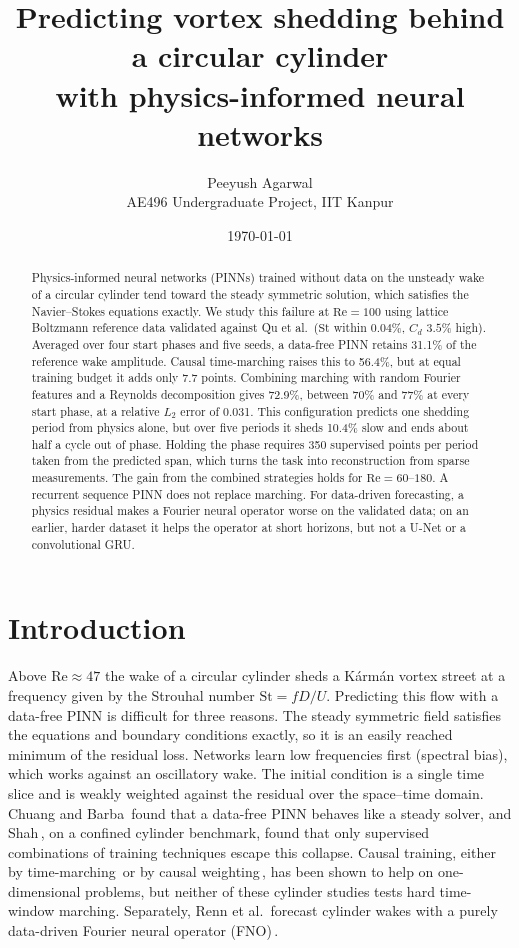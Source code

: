 \documentclass[11pt,a4paper]{article}
\title{\textbf{Predicting vortex shedding behind a circular cylinder\\
with physics-informed neural networks}}
\author{Peeyush Agarwal\\[2pt]
\small AE496 Undergraduate Project, IIT Kanpur}
\date{\today}
\newcommand{\Rey}{\mathrm{Re}}
\newcommand{\St}{\mathrm{St}}
\newcommand{\Cd}{C_d}
\begin{document}
\maketitle

\begin{abstract}
\noindent
Physics-informed neural networks (PINNs) trained without data on the unsteady
wake of a circular cylinder tend toward the steady symmetric solution, which
satisfies the Navier--Stokes equations exactly. We study this failure at
$\Rey = 100$ using lattice Boltzmann reference data validated against Qu et
al.\ ($\St$ within $0.04\%$, $\Cd$ $3.5\%$ high). Averaged over four start
phases and five seeds, a data-free PINN retains 31.1\% of the reference wake
amplitude. Causal time-marching raises this to 56.4\%, but at equal training
budget it adds only 7.7 points. Combining marching with random Fourier
features and a Reynolds decomposition gives 72.9\%, between 70\% and 77\% at
every start phase, at a relative $L_2$ error of 0.031. This configuration
predicts one shedding period from physics alone, but over five periods it
sheds 10.4\% slow and ends about half a cycle out of phase. Holding the phase
requires 350 supervised points per period taken from the predicted span, which
turns the task into reconstruction from sparse measurements. The gain from
the combined strategies holds for $\Rey = 60$--$180$. A recurrent sequence
PINN does not replace marching. For data-driven forecasting, a physics
residual makes a Fourier neural operator worse on the validated data; on an
earlier, harder dataset it helps the operator at short horizons, but not a
U-Net or a convolutional GRU.
\end{abstract}

\section{Introduction}

Above $\Rey \approx 47$ the wake of a circular cylinder sheds a K\'arm\'an
vortex street at a frequency given by the Strouhal number $\St = fD/U$.
Predicting this flow with a data-free PINN is difficult for three reasons. The
steady symmetric field satisfies the equations and boundary conditions exactly,
so it is an easily reached minimum of the residual loss. Networks learn low
frequencies first (spectral bias), which works against an oscillatory wake.
The initial condition is a single time slice and is weakly weighted against the
residual over the space--time domain. Chuang and Barba\,\cite{chuang2023} found
that a data-free PINN behaves like a steady solver, and Shah\,\cite{shah2026},
on a confined cylinder benchmark, found that only supervised combinations of
training techniques escape this collapse. Causal training, either by
time-marching\,\cite{krishnapriyan2021} or by causal
weighting\,\cite{wang2024causality}, has been shown to help on one-dimensional
problems, but neither of these cylinder studies tests hard time-window
marching. Separately, Renn et al.\,\cite{renn2023} forecast cylinder wakes
with a purely data-driven Fourier neural operator (FNO)\,\cite{li2021fno}.
\end{document}
